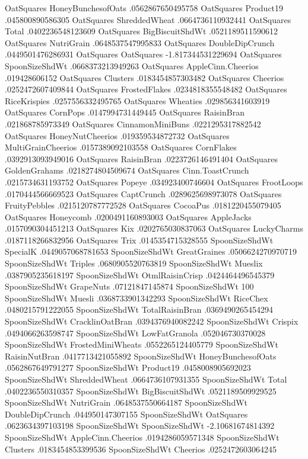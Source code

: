OatSquares	HoneyBunchesofOats	.0562867650495758
OatSquares	Product19	.045800890586305
OatSquares	ShreddedWheat	.0664736110932441
OatSquares	Total	.0402236548123609
OatSquares	BigBiscuitShdWt	.0521189511590612
OatSquares	NutriGrain	.0648537547995833
OatSquares	DoubleDipCrunch	.0449501476286931
OatSquares	OatSquares	-1.817344531229694
OatSquares	SpoonSizeShdWt	.0668373213949263
OatSquares	AppleCinn.Cheerios	.019428606152
OatSquares	Clusters	.0183454857303482
OatSquares	Cheerios	.0252472607409844
OatSquares	FrostedFlakes	.0234818355548482
OatSquares	RiceKrispies	.0257556332495765
OatSquares	Wheaties	.029856341603919
OatSquares	CornPops	.0147994731449445
OatSquares	RaisinBran	.021868785973349
OatSquares	CinnamonMiniBuns	.0221295317882542
OatSquares	HoneyNutCheerios	.019359534872732
OatSquares	MultiGrainCheerios	.0157389092103558
OatSquares	CornFlakes	.0392913093949016
OatSquares	RaisinBran	.0223726146491404
OatSquares	GoldenGrahams	.0218274804509674
OatSquares	Cinn.ToastCrunch	.0215734631193752
OatSquares	Popeye	.034923400746604
OatSquares	FrootLoops	.0170444566669523
OatSquares	CaptCrunch	.0289625698973078
OatSquares	FruityPebbles	.0215120787772528
OatSquares	CocoaPus	.0181220455079405
OatSquares	Honeycomb	.0200491160893003
OatSquares	AppleJacks	.0157090304451213
OatSquares	Kix	.0202765030837063
OatSquares	LuckyCharms	.0187118266832956
OatSquares	Trix	.0145354715328555
SpoonSizeShdWt	SpecialK	.0449057068781653
SpoonSizeShdWt	GreatGraines	.0506624270970719
SpoonSizeShdWt	Triples	.0680905520763819
SpoonSizeShdWt	Mueslix	.0387905235618197
SpoonSizeShdWt	OtmlRaisinCrisp	.0424464496545379
SpoonSizeShdWt	GrapeNuts	.07121847145874
SpoonSizeShdWt	100%
SpoonSizeShdWt	Muesli	.0368733901342293
SpoonSizeShdWt	RiceChex	.0480215791222055
SpoonSizeShdWt	TotalRaisinBran	.0369490265454294
SpoonSizeShdWt	CracklinOatBran	.0394376940082242
SpoonSizeShdWt	Crispix	.0494066263598747
SpoonSizeShdWt	LowFatGranola	.052046730370028
SpoonSizeShdWt	FrostedMiniWheats	.0552265124405779
SpoonSizeShdWt	RaisinNutBran	.0417713421055892
SpoonSizeShdWt	HoneyBunchesofOats	.0562867649791277
SpoonSizeShdWt	Product19	.0458008905692023
SpoonSizeShdWt	ShreddedWheat	.0664736107931355
SpoonSizeShdWt	Total	.0402236550310357
SpoonSizeShdWt	BigBiscuitShdWt	.0521189509929525
SpoonSizeShdWt	NutriGrain	.0648537550664187
SpoonSizeShdWt	DoubleDipCrunch	.044950147307155
SpoonSizeShdWt	OatSquares	.0623634397103198
SpoonSizeShdWt	SpoonSizeShdWt	-2.10681674814392
SpoonSizeShdWt	AppleCinn.Cheerios	.0194286059571348
SpoonSizeShdWt	Clusters	.0183454853399536
SpoonSizeShdWt	Cheerios	.0252472603064245
